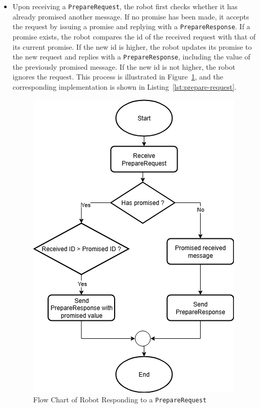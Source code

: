 \documentclass[12pt,a4paper]{article}
\begin{document}
\begin{itemize}


\item Upon receiving a \texttt{PrepareRequest}, the robot first checks whether it has already promised another message. If no promise has been made, it accepts the request by issuing a promise and replying with a \texttt{PrepareResponse}. If a promise exists, the robot compares the id of the received request with that of its current promise. If the new id is higher, the robot updates its promise to the new request and replies with a \texttt{PrepareResponse}, including the value of the previously promised message. If the new id is not higher, the robot ignores the request. This process is illustrated in Figure~\ref{fig:prepare-request}, and the corresponding implementation is shown in Listing~\ref{lst:prepare-request}.

\begin{figure}
    \centering
    \includegraphics[width=0.5\linewidth]{images/prepare_request.png}
    \caption{Flow Chart of Robot Responding to a \texttt{PrepareRequest}}   
    \label{fig:prepare-request}
\end{figure}


\end{itemize}
\end{document}

